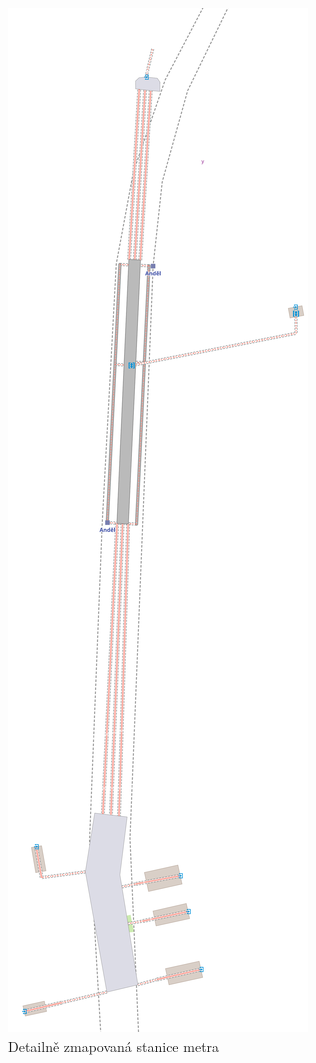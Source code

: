 \begin{figure}
  \centering
    \includegraphics[height=0.99\textheight]{../img/andel.pdf}
  \caption{Detailně zmapovaná stanice metra}
  \label{fig:metro-detail}
\end{figure}

